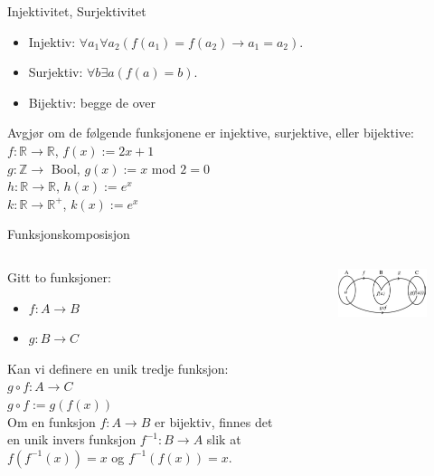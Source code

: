 \begin{frame}{Injektivitet, Surjektivitet}
    \begin{itemize}
        \item Injektiv:  $\forall a_1 \forall a_2 (f(a_1) = f(a_2) \rightarrow a_1 = a_2)$.\\
        \item Surjektiv: $\forall b \exists a (f(a) = b)$.\\
        \item Bijektiv: begge de over \\
    \end{itemize}
    \pause
    \begin{block}{Avgjør om de følgende funksjonene er injektive, surjektive, eller bijektive:}
        $f : \mathbb{R} \rightarrow \mathbb{R}$, $f(x) := 2x + 1$\\
        $g : \mathbb{Z} \rightarrow $ Bool, $g(x) := x$ mod $2 = 0$\\
        $h : \mathbb{R} \rightarrow \mathbb{R}$, $h(x) := e^x$\\
        $k : \mathbb{R} \rightarrow \mathbb{R^+}$, $k(x) := e^x$\\
    \end{block}
\end{frame}

\begin{frame}{Funksjonskomposisjon}
    \begin{columns}
    \begin{column}{0.5\textwidth}
Gitt to funksjoner:
    \begin{itemize}
        \item $f : A \rightarrow B$
        \item $g : B \rightarrow C$
    \end{itemize}
Kan vi definere en unik tredje funksjon: \\
    $g \circ f : A \rightarrow C$\\
    $g \circ f := g(f(x))$\\
    \pause
Om en funksjon $f : A \rightarrow B$ er bijektiv, finnes det en unik invers funksjon $f^{-1} : B \rightarrow A$ slik at $f(f^{-1}(x)) = x$ og $f^{-1}(f(x)) = x$.
    \end{column}
    \begin{column}{0.33\textwidth}
    \begin{figure}
       \includegraphics[scale = 0.4]{gof.jpeg} 
    \end{figure}
        
    \end{column}
    \end{columns}
\end{frame}

